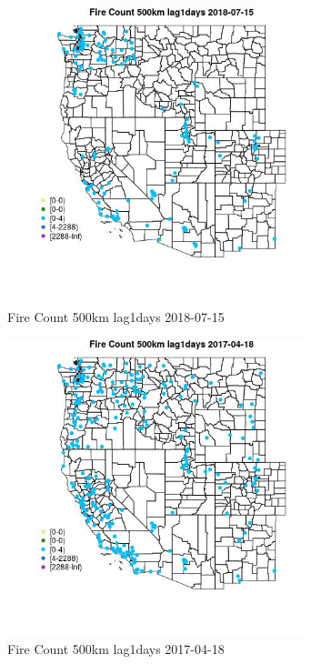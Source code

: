 \begin{figure} 
\centering  
\includegraphics[width=0.77\textwidth]{Code_Outputs/Report_ML_input_PM25_Step4_part_e_de_duplicated_aves_compiled_2019-05-20wNAs_MapObsFire_Count_500km_lag1days2018-07-15.jpg} 
\caption{\label{fig:Report_ML_input_PM25_Step4_part_e_de_duplicated_aves_compiled_2019-05-20wNAsMapObsFire_Count_500km_lag1days2018-07-15}Fire Count 500km lag1days 2018-07-15} 
\end{figure} 
 

\begin{figure} 
\centering  
\includegraphics[width=0.77\textwidth]{Code_Outputs/Report_ML_input_PM25_Step4_part_e_de_duplicated_aves_compiled_2019-05-20wNAs_MapObsFire_Count_500km_lag1days2017-04-18.jpg} 
\caption{\label{fig:Report_ML_input_PM25_Step4_part_e_de_duplicated_aves_compiled_2019-05-20wNAsMapObsFire_Count_500km_lag1days2017-04-18}Fire Count 500km lag1days 2017-04-18} 
\end{figure} 
 

